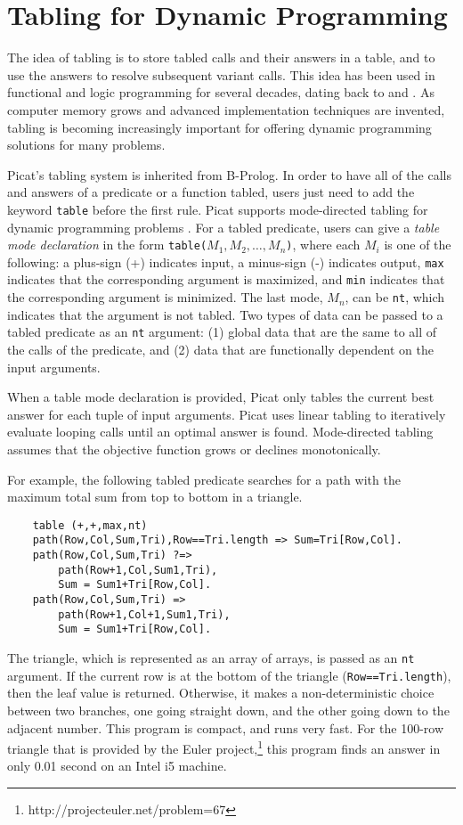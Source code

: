 \documentclass{new_tlp}
\begin{document}
\section{Tabling for Dynamic Programming}
The idea of tabling is to store tabled calls and their answers in a table, and to use the answers to resolve subsequent variant calls. This idea has been used in functional and logic programming for several decades, dating back to \cite{Michie68} and \cite{Tamaki86}. As computer memory grows and advanced implementation techniques are invented, tabling is becoming increasingly important for offering dynamic programming solutions for many problems. 

Picat's tabling system is inherited from B-Prolog. In order to have all of the calls and answers of a predicate or a function tabled, users just need to add the keyword \texttt{table} before the first rule. Picat supports mode-directed tabling for dynamic programming problems \cite{GuoG08}.  For a tabled predicate, users can give a \emph{table mode declaration} in the form {\tt table($M_{1},M_{2},\ldots,M_{n}$)}, where each $M_{i}$ is one of the following: a plus-sign (+) indicates input, a minus-sign (-) indicates output, \texttt{max} indicates that the corresponding argument is maximized, and \texttt{min} indicates that the corresponding argument is minimized. The last mode, $M_{n}$, can be \texttt{nt}, which indicates that the argument is not tabled. Two types of data can be passed to a tabled predicate as an \texttt{nt} argument: (1) global data that are the same to all of the calls of the predicate, and (2) data that are functionally dependent on the input arguments. 

When a table mode declaration is provided, Picat only tables the current best answer for each tuple of input arguments. Picat uses linear tabling \cite{zhou08tab} to iteratively evaluate looping calls until an optimal answer is found. Mode-directed tabling assumes that the objective function grows or declines monotonically.

For example, the following tabled predicate searches for a path with the maximum total sum from top to bottom in a triangle. 
\begin{verbatim}
    table (+,+,max,nt) 
    path(Row,Col,Sum,Tri),Row==Tri.length => Sum=Tri[Row,Col].
    path(Row,Col,Sum,Tri) ?=> 
        path(Row+1,Col,Sum1,Tri),
        Sum = Sum1+Tri[Row,Col].
    path(Row,Col,Sum,Tri) => 
        path(Row+1,Col+1,Sum1,Tri),
        Sum = Sum1+Tri[Row,Col].    
\end{verbatim}
The triangle, which is represented as an array of arrays, is passed as an {\tt nt} argument. If the current row is at the bottom of the triangle ({\tt Row==Tri.length}), then the leaf value is returned. Otherwise, it makes a non-deterministic choice between two branches, one going straight down, and the other going down to the adjacent number. This program is compact, and runs very fast. For the 100-row triangle that is provided by the Euler project,\footnote{http://projecteuler.net/problem=67} this program finds an answer in only 0.01 second on an Intel i5 machine.
\end{document}
